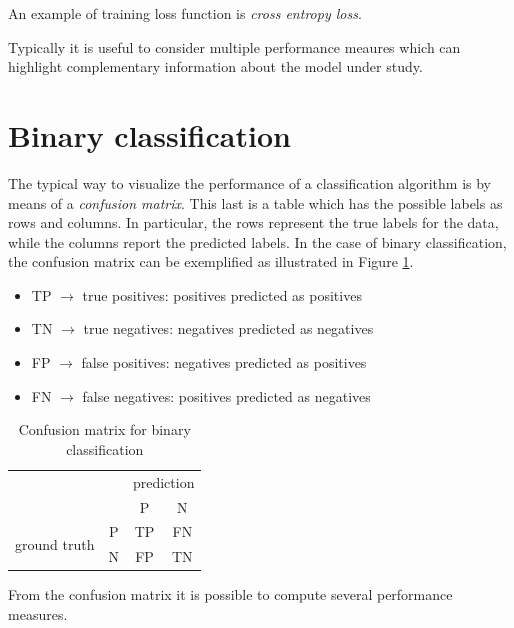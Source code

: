 An example of training loss function is \textit{cross entropy loss}.\newline

Typically it is useful to consider multiple performance meaures which can highlight complementary information about the model under study.

\section{Binary classification}
\label{sec::performanceBinaryClassification}
The typical way to visualize the performance of a classification algorithm is by means of a \textit{confusion matrix}. This last is a table which has the possible labels as rows and columns. In particular, the rows represent the true labels for the data, while the columns report the predicted labels. In the case of binary classification, the confusion matrix can be exemplified as illustrated in Figure \ref{fig:binClassConfusionMatrix}.

\begin{itemize}
    \item TP $\rightarrow$ true positives: positives predicted as positives
    \item TN $\rightarrow$ true negatives: negatives predicted as negatives
    \item FP $\rightarrow$ false positives: negatives predicted as positives
    \item FN $\rightarrow$ false negatives: positives predicted as negatives
\end{itemize}


\begin{table}[ht]
    \centering
    \begin{tabular}{cc|cc|}
    \cline{3-4}
     &  & \multicolumn{2}{c|}{prediction} \\ \cline{3-4} 
     &  & \multicolumn{1}{c|}{P} & N \\ \hline
    \multicolumn{1}{|c|}{\multirow{2}{*}{ground truth}} & P & \multicolumn{1}{c|}{TP} & FN \\ \cline{2-4} 
    \multicolumn{1}{|c|}{} & N & \multicolumn{1}{c|}{FP} & TN \\ \hline
    \end{tabular}
    \caption{Confusion matrix for binary classification}
    \label{fig:binClassConfusionMatrix}
\end{table}


From the confusion matrix it is possible to compute several performance measures.

